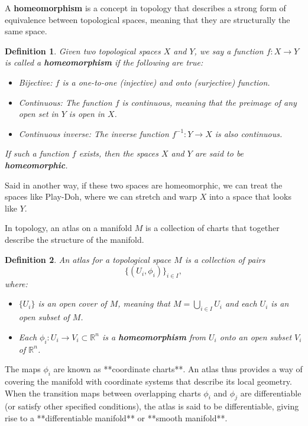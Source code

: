 \documentclass{article}
\newtheorem{definition}{Definition}
\begin{document}
A \textbf{homeomorphism} is a concept in topology that describes a strong form of equivalence between topological spaces, meaning that they are structurally the same space.
\begin{definition}
		Given two topological spaces \( X \) and \( Y \), we say a function \( f: X \rightarrow Y \) is called a \textbf{homeomorphism} if the following are true:

		\begin{itemize}
				\item Bijective: \( f \) is a one-to-one (injective) and onto (surjective) function.
				\item Continuous: The function \( f \) is continuous, meaning that the preimage of any open set in \( Y \) is open in \( X \).
				\item Continuous inverse: The inverse function \( f^{-1}: Y \to X \) is also continuous.
\end{itemize}

If such a function \( f \) exists, then the spaces \( X \) and \( Y \) are said to be \textbf{homeomorphic}.
\end{definition}	

Said in another way, if these two spaces are homeomorphic, we can treat the spaces like Play-Doh, where we can stretch and warp $X$ into a space that looks like $Y$.  

In topology, an atlas on a manifold \( M \) is a collection of charts that together describe the structure of the manifold.

\begin{definition}
		An atlas for a topological space \( M \) is a collection of pairs \[ \{(U_i, \phi_i)\}_{i \in I}, \] where:

		\begin{itemize}
				\item\( \{U_i\} \) is an open cover of \( M \), meaning that \( M = \bigcup_{i \in I} U_i \) and each \( U_i \) is an open subset of \( M \).
				\item Each \( \phi_i: U_i \to V_i \subset \mathbb{R}^n \) is a \textbf{homeomorphism} from \( U_i \) onto an open subset \( V_i \) of \( \mathbb{R}^n \).
		\end{itemize}
\end{definition}
The maps \( \phi_i \) are known as **coordinate charts**. An atlas thus provides a way of covering the manifold with coordinate systems that describe its local geometry. When the transition maps between overlapping charts \( \phi_i \) and \( \phi_j \) are differentiable (or satisfy other specified conditions), the atlas is said to be differentiable, giving rise to a **differentiable manifold** or **smooth manifold**.
\end{document}
